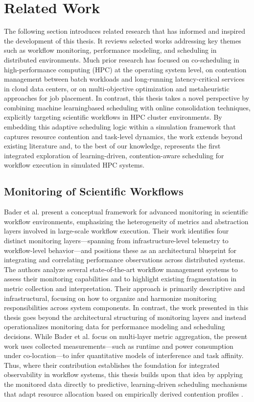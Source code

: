 \section{Related Work}
\label{cha:relatedwork}
The following section introduces related research that has informed and inspired the development of this thesis. It reviews selected works addressing key themes such as workflow monitoring, performance modeling, and scheduling in distributed environments. Much prior research has focused on co-scheduling in high-performance computing (HPC) at the operating system level, on contention management between batch workloads and long-running latency-critical services in cloud data centers, or on multi-objective optimization and metaheuristic approaches for job placement. In contrast, this thesis takes a novel perspective by combining machine learningbased scheduling with online consolidation techniques, explicitly targeting scientific workflows in HPC cluster environments. By embedding this adaptive scheduling logic within a simulation framework that captures resource contention and task-level dynamics, the work extends beyond existing literature and, to the best of our knowledge, represents the first integrated exploration of learning-driven, contention-aware scheduling for workflow execution in simulated HPC systems.

\subsection{Monitoring of Scientific Workflows}
\label{sec:relatedwork_monitoring_scientific_workflows}
Bader et al. present a conceptual framework for advanced monitoring in scientific workflow environments, emphasizing the heterogeneity of metrics and abstraction layers involved in large-scale workflow execution. Their work identifies four distinct monitoring layers—spanning from infrastructure-level telemetry to workflow-level behavior—and positions these as an architectural blueprint for integrating and correlating performance observations across distributed systems. The authors analyze several state-of-the-art workflow management systems to assess their monitoring capabilities and to highlight existing fragmentation in metric collection and interpretation. Their approach is primarily descriptive and infrastructural, focusing on how to organize and harmonize monitoring responsibilities across system components.
In contrast, the work presented in this thesis goes beyond the architectural structuring of monitoring layers and instead operationalizes monitoring data for performance modeling and scheduling decisions. While Bader et al. focus on multi-layer metric aggregation, the present work uses collected measurements—such as runtime and power consumption under co-location—to infer quantitative models of interference and task affinity. Thus, where their contribution establishes the foundation for integrated observability in workflow systems, this thesis builds upon that idea by applying the monitored data directly to predictive, learning-driven scheduling mechanisms that adapt resource allocation based on empirically derived contention profiles \cite{Bader_2022}.

